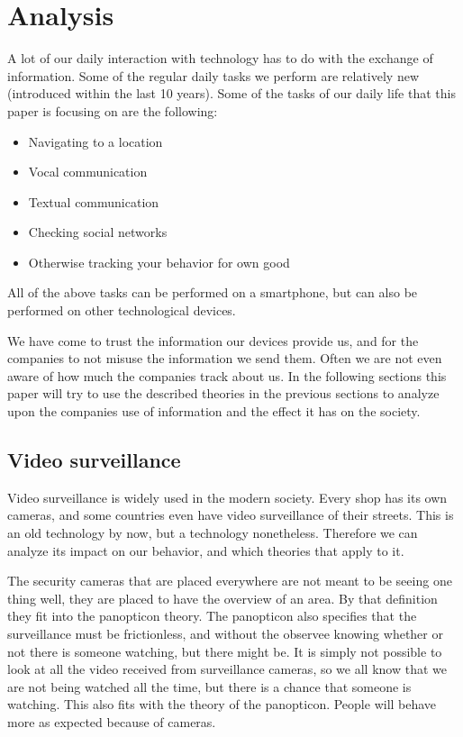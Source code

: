 \section{Analysis}
A lot of our daily interaction with technology has to do with the exchange of information. Some of the regular daily tasks we perform are relatively new (introduced within the last 10 years). Some of the tasks of our daily life that this paper is focusing on are the following:
\begin{itemize}
  \item{Navigating to a location}
  \item{Vocal communication}
  \item{Textual communication}
  \item{Checking social networks}
  \item{Otherwise tracking your behavior for own good}
\end{itemize}

All of the above tasks can be performed on a smartphone, but can also be performed on other technological devices.

We have come to trust the information our devices provide us, and for the companies to not misuse the information we send them. Often we are not even aware of how much the companies track about us. In the following sections this paper will try to use the described theories in the previous sections to analyze upon the companies use of information and the effect it has on the society.

\subsection{Video surveillance}
Video surveillance is widely used in the modern society. Every shop has its own cameras, and some countries even have video surveillance of their streets. This is an old technology by now, but a technology nonetheless. Therefore we can analyze its impact on our behavior, and which theories that apply to it.

The security cameras that are placed everywhere are not meant to be seeing one thing well, they are placed to have the overview of an area. By that definition they fit into the panopticon theory. The panopticon also specifies that the surveillance must be frictionless, and without the observee knowing whether or not there is someone watching, but there might be. It is simply not possible to look at all the video received from surveillance cameras, so we all know that we are not being watched all the time, but there is a chance that someone is watching. This also fits with the theory of the panopticon. People will behave more as expected because of cameras.

